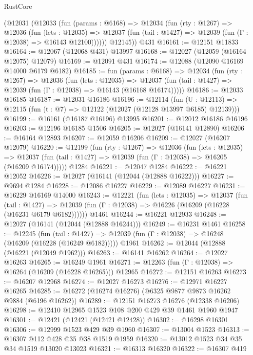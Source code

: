 \begin{lexlean}{RustCore}
\begin{coremodule}
      (@12031
        (@12033
          (fun (params : @6168) =>
          @12034
            (fun (rty : @1267) =>
            @12036
              (fun (lets : @12035) =>
              @12037 (fun (tail : @1427) => @12039 (fun (Γ : @12038) => @16143 @12100))))))
        @12145))
    @431
@16161 := @12151 @11833
@16164 := @12067 (@12068 @431) @13997
@16168 := @12027 (@12059 (@16164 @12075) @12079)
@16169 := @12091 @431
@16174 := @12088 (@12090 @16169 @14000 @6179 @6182)
@16185 := fun (params : @6168) =>
  @12034
    (fun (rty : @1267) =>
    @12036
      (fun (lets : @12035) =>
      @12037 (fun (tail : @1427) => @12039 (fun (Γ : @12038) => @16143 (@16168 @16174)))))
@16186 := @12033 @16185
@16187 := @12031 @16186
@16196 := @12114
    (fun (U : @12113) => @12115 (fun (t : @7) => @12122 (@12027 (@12128 @13997 @6185) @12139)))
@16199 := @16161 (@16187 @16196) @13995
@16201 := @12012 @16186 @16196
@16203 := @12196 @16185 @1506
@16205 := @12027 (@16141 @12890)
@16206 := @16164 @12893
@16207 := @12059 @16206
@16209 := @12027 (@16207 @12079)
@16220 := @12199
    (fun (rty : @1267) =>
    @12036
      (fun (lets : @12035) =>
      @12037 (fun (tail : @1427) => @12039 (fun (Γ : @12038) => @16205 (@16209 @16174)))))
    @1284
@16221 := @12047 @1284
@16222 := @16221 @12052
@16226 := @12027 (@16141 (@12044 (@12888 @16222)))
@16227 := @9694 @1284
@16228 := @12086 @16227
@16229 := @12089 @16227
@16231 := @16229 @16169 @14000
@16243 := @12221
    (fun (lets : @12035) =>
    @12037
      (fun (tail : @1427) =>
      @12039 (fun (Γ : @12038) => @16226 (@16209 (@16228 (@16231 @6179 @6182))))))
    @1461
@16244 := @16221 @12933
@16248 := @12027 (@16141 (@12044 (@12888 @16244)))
@16249 := @16231 @1461
@16258 := @12245
    (fun (tail : @1427) => @12039 (fun (Γ : @12038) => @16248 (@16209 (@16228 (@16249 @6182)))))
    @1961
@16262 := @12044 (@12888 (@16221 (@12049 @1962)))
@16263 := @16141 @16262
@16264 := @12027 @16263
@16265 := @16249 @1961
@16271 := @12263 (fun (Γ : @12038) => @16264 (@16209 (@16228 @16265))) @12965
@16272 := @12151 @16263
@16273 := @16207 @12968
@16274 := @12027 @16273
@16276 := @12971 @16227 @16265
@16285 := @16272 (@16274 @16276) (@6325 @9877 @9873 @16262 @9884 (@6196 @16262))
@16289 := @12151 @16273 @16276 (@12338 @16206)
@16298 := @12410 @12965 @1523 @108 @200 @429 @39 @1461 @1960 @1947
@16301 := @12421 (@12421 (@12421 @12428))
@16302 := @16298 @16301
@16306 := @12999 @1523 @429 @39 @1960
@16307 := @13004 @1523
@16313 := @16307 @112 @428 @35 @38 @1519 @1959
@16320 := @13012 @1523 @34 @35 @34 @1519 @13020 @13023
@16321 := @16313 @16320
@16322 := @16307 @419

\end{coremodule}
\end{lexlean}
